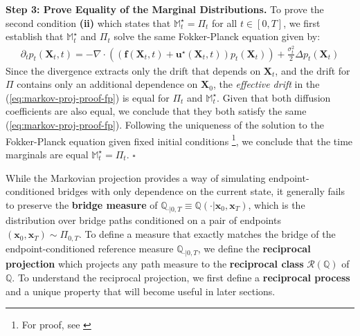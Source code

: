 \documentclass{article}
\newcommand{\boldtext}[1]{\textbf{\textcolor{MyGreen}{#1}}}
\begin{document}
\textbf{Step 3: Prove Equality of the Marginal Distributions. }
To prove the second condition \textbf{(ii)} which states that $\mathbb{M}^\star_t=\Pi_t$ for all $t\in [0,T]$, we first establish that $\mathbb{M}^\star_t$ and $\Pi_t$ solve the same Fokker-Planck equation given by:
\begin{align}
    \partial_t p_t(\boldsymbol{X}_t,t)=-\nabla\cdot \left((\boldsymbol{f}(\boldsymbol{X}_t,t)+\boldsymbol{u}^\star(\boldsymbol{X}_t,t))p_t(\boldsymbol{X}_t)\right)+\frac{\sigma_t^2}{2}\Delta p_t(\boldsymbol{X}_t)\tag{Fokker-Planck Equation}\label{eq:markov-proj-proof-fp}
\end{align}
Since the divergence extracts only the drift that depends on $\boldsymbol{X}_t$, and the drift for $\Pi$ contains only an additional dependence on $\boldsymbol{X}_0$, the \textit{effective drift} in the (\ref{eq:markov-proj-proof-fp}) is equal for $\Pi_t$ and $\mathbb{M}^\star_t$. Given that both diffusion coefficients are also equal, we conclude that they both satisfy the same (\ref{eq:markov-proj-proof-fp}). Following the uniqueness of the solution to the Fokker-Planck equation given fixed initial conditions \footnote{For proof, see \citep{bogachev2021uniqueness}}, we conclude that the time marginals are equal $\mathbb{M}^\star_t=\Pi_t$. \hfill $\square$

While the Markovian projection provides a way of simulating endpoint-conditioned bridges with only dependence on the current state, it generally fails to preserve the \boldtext{bridge measure} of $\mathbb{Q}_{\cdot|0,T}\equiv \mathbb{Q}(\cdot|\boldsymbol{x}_0, \boldsymbol{x}_T)$, which is the distribution over bridge paths conditioned on a pair of endpoints $(\boldsymbol{x}_0, \boldsymbol{x}_T)\sim \Pi_{0,T}$. To define a measure that exactly matches the bridge of the endpoint-conditioned reference measure $\mathbb{Q}_{\cdot|0,T}$, we define the \textbf{reciprocal projection} which projects any path measure to the \textbf{reciprocal class} $\mathcal{R}(\mathbb{Q})$ of $\mathbb{Q}$. To understand the reciprocal projection, we first define a \boldtext{reciprocal process} and a unique property that will become useful in later sections.
\end{document}
